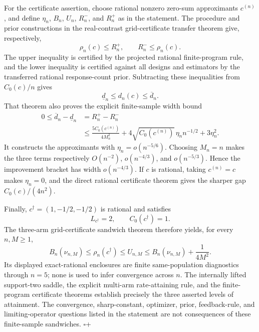For the certificate assertion, choose rational nonzero zero-sum approximants \(c^{(n)}\), and define \(\eta_n\), \(B_n\), \(U_n\), \(R_n^-\), and \(R_n^+\) as in the statement. The procedure and prior constructions in the real-contrast grid-certificate transfer theorem give, respectively,
\[
 \rho_n(c)\leq R_n^+,
 \qquad
 R_n^-\leq\rho_n(c).
\]
The upper inequality is certified by the projected rational finite-program rule, and the lower inequality is certified against all designs and estimators by the transferred rational response-count prior. Subtracting these inequalities from \(C_0(c)/n\) gives
\[
 \underline d_n\leq d_n(c)\leq\overline d_n.
\]
That theorem also proves the explicit finite-sample width bound
\[
 \begin{aligned}
 0\leq\overline d_n-\underline d_n
 &=R_n^+-R_n^-\\
 &\leq\frac{5C_0(c^{(n)})}{4M_n^2}
 +4\sqrt{C_0(c^{(n)})}\,\eta_n n^{-1/2}
 +3\eta_n^2.
 \end{aligned}
\]
It constructs the approximants with \(\eta_n=o(n^{-5/6})\). Choosing \(M_n=n\) makes the three terms respectively \(O(n^{-2})\), \(o(n^{-4/3})\), and \(o(n^{-5/3})\). Hence the improvement bracket has width \(o(n^{-4/3})\). If \(c\) is rational, taking \(c^{(n)}=c\) makes \(\eta_n=0\), and the direct rational certificate theorem gives the sharper gap \(C_0(c)/(4n^2)\).

Finally, \(c^\dagger=(1,-1/2,-1/2)\) is rational and satisfies
\[
 L_{c^\dagger}=2,
 \qquad C_0(c^\dagger)=1.
\]
The three-arm grid-certificate sandwich theorem therefore yields, for every \(n,M\geq1\),
\[
 B_n(\nu_{n,M})\leq\rho_n(c^\dagger)\leq U_{n,M}
 \leq B_n(\nu_{n,M})+\frac1{4M^2}.
\]
Its displayed exact-rational enclosures are finite same-population diagnostics through \(n=5\); none is used to infer convergence across \(n\). The internally lifted support-two saddle, the explicit multi-arm rate-attaining rule, and the finite-program certificate theorems establish precisely the three asserted levels of attainment. The convergence, sharp-constant, optimizer, prior, feedback-rule, and limiting-operator questions listed in the statement are not consequences of these finite-sample sandwiches. \(\square\)+